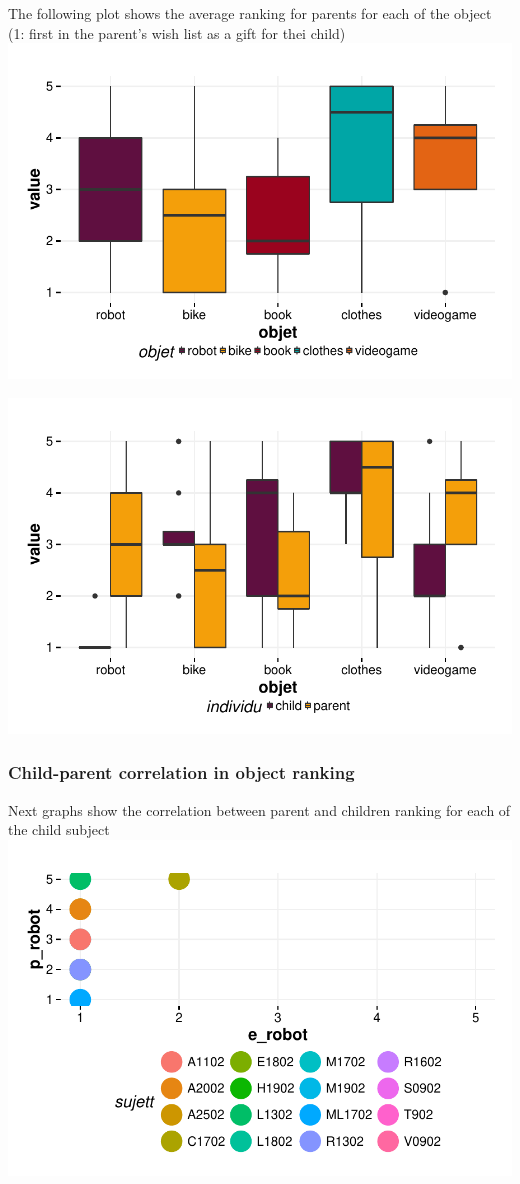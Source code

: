 \documentclass{article}
\begin{document}
The following plot shows the average ranking for parents for each of the object (1: first in the parent's wish list as a gift for thei child)
\includegraphics{interviews-plot_coirs_parent}

\includegraphics{interviews-plot_coirs_parent_enfant}

\subsubsection{Child-parent correlation in object ranking} 
Next graphs show the correlation between parent and children ranking for each of the child subject\newline
\includegraphics{interviews-plot_coirs_parent_enfant_robot}
\end{document}
